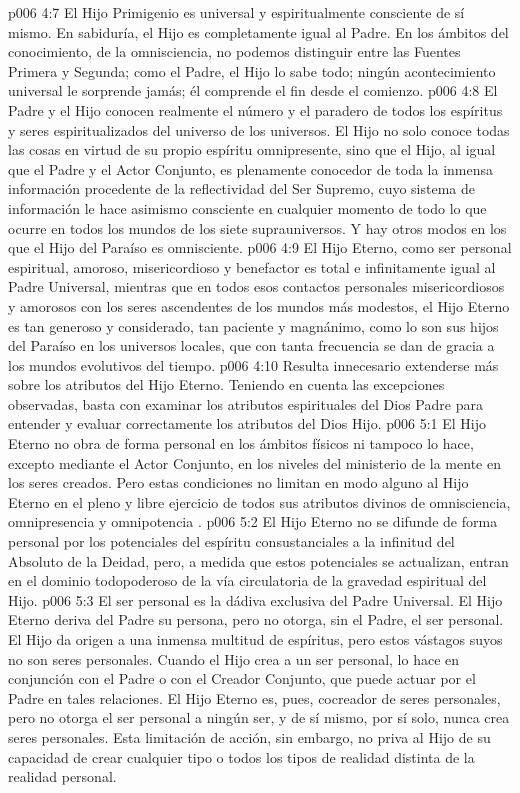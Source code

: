 \vs p006 4:7 \pc El Hijo Primigenio es universal y espiritualmente consciente de sí mismo. En sabiduría, el Hijo es completamente igual al Padre. En los ámbitos del conocimiento, de la omnisciencia, no podemos distinguir entre las Fuentes Primera y Segunda; como el Padre, el Hijo lo sabe todo; ningún acontecimiento universal le sorprende jamás; él comprende el fin desde el comienzo.
\vs p006 4:8 \pc El Padre y el Hijo conocen realmente el número y el paradero de todos los espíritus y seres espiritualizados del universo de los universos. El Hijo no solo conoce todas las cosas en virtud de su propio espíritu omnipresente, sino que el Hijo, al igual que el Padre y el Actor Conjunto, es plenamente conocedor de toda la inmensa información procedente de la reflectividad del Ser Supremo, cuyo sistema de información le hace asimismo consciente en cualquier momento de todo lo que ocurre en todos los mundos de los siete suprauniversos. Y hay otros modos en los que el Hijo del Paraíso es omnisciente.
\vs p006 4:9 \pc El Hijo Eterno, como ser personal espiritual, amoroso, misericordioso y benefactor es total e infinitamente igual al Padre Universal, mientras que en todos esos contactos personales misericordiosos y amorosos con los seres ascendentes de los mundos más modestos, el Hijo Eterno es tan generoso y considerado, tan paciente y magnánimo, como lo son sus hijos del Paraíso en los universos locales, que con tanta frecuencia se dan de gracia a los mundos evolutivos del tiempo.
\vs p006 4:10 Resulta innecesario extenderse más sobre los atributos del Hijo Eterno. Teniendo en cuenta las excepciones observadas, basta con examinar los atributos espirituales del Dios Padre para entender y evaluar correctamente los atributos del Dios Hijo.
\vs p006 5:1 El Hijo Eterno no obra de forma personal en los ámbitos físicos ni tampoco lo hace, excepto mediante el Actor Conjunto, en los niveles del ministerio de la mente en los seres creados. Pero estas condiciones no limitan en modo alguno al Hijo Eterno en el pleno y libre ejercicio de todos sus atributos divinos de omnisciencia, omnipresencia y omnipotencia .
\vs p006 5:2 El Hijo Eterno no se difunde de forma personal por los potenciales del espíritu consustanciales a la infinitud del Absoluto de la Deidad, pero, a medida que estos potenciales se actualizan, entran en el dominio todopoderoso de la vía circulatoria de la gravedad espiritual del Hijo.
\vs p006 5:3 El ser personal es la dádiva exclusiva del Padre Universal. El Hijo Eterno deriva del Padre su persona, pero no otorga, sin el Padre, el ser personal. El Hijo da origen a una inmensa multitud de espíritus, pero estos vástagos suyos no son seres personales. Cuando el Hijo crea a un ser personal, lo hace en conjunción con el Padre o con el Creador Conjunto, que puede actuar por el Padre en tales relaciones. El Hijo Eterno es, pues, cocreador de seres personales, pero no otorga el ser personal a ningún ser, y de sí mismo, por sí solo, nunca crea seres personales. Esta limitación de acción, sin embargo, no priva al Hijo de su capacidad de crear cualquier tipo o todos los tipos de realidad distinta de la realidad personal.
